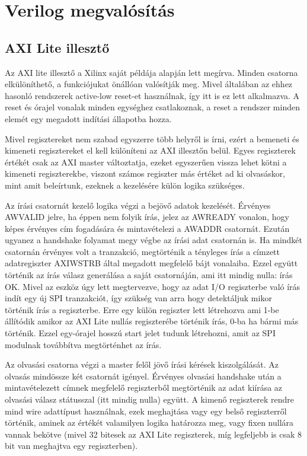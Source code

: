 \documentclass[a4paper,11pt]{article}
\begin{document}
\section{Verilog megvalósítás}

\subsection{AXI Lite illesztő}
Az AXI lite illesztő a Xilinx saját példája alapján lett megírva. Minden csatorna elkülöníthető, a funkciójukat önállóan valósítják meg. Mivel általában az ehhez hasonló rendszerek active-low reset-et használnak, így itt is ez lett alkalmazva. A reset és órajel vonalak minden egységhez csatlakoznak, a reset a rendszer minden elemét egy megadott indítási állapotba hozza.

Mivel regisztereket nem szabad egyszerre több helyről is írni, ezért a bemeneti és kimeneti regisztereket el kell különíteni az AXI illesztőn belül. Egyes regiszterek értékét csak az AXI master változtatja, ezeket egyszerűen vissza lehet kötni a kimeneti regiszterekbe, viszont számos regiszter más értéket ad ki olvasáskor, mint amit beleírtunk, ezeknek a kezelésére külön logika szükséges.

Az írási csatornát kezelő logika végzi a bejövő adatok kezelését. Érvényes AWVALID jelre, ha éppen nem folyik írás, jelez az AWREADY vonalon, hogy képes érvényes cím fogadására és mintavételezi a AWADDR csatornát. Ezután ugyanez a handshake folyamat megy végbe az írási adat csatornán is. Ha mindkét csatornán érvényes volt a tranzakció, megtörténik a tényleges írás a címzett adatregiszter AXI\textunderscore WSTRB által megadott megfelelő bájt vonalaiba. Ezzel együtt történik az írás válasz generálása a saját csatornáján, ami itt mindig nulla: írás OK. Mivel az eszköz úgy lett megtervezve, hogy az adat I/O regiszterbe való írás indít egy új SPI tranzakciót, így szükség van arra hogy detektáljuk mikor történik írás a regiszterbe. Erre egy külön regiszter lett létrehozva ami 1-be állítódik amikor az AXI Lite nullás regiszterébe történik írás, 0-ba ha bármi más történik. Ezzel egy-órajel hosszú start jelet tudunk létrehozni, amit az SPI modulnak továbbítva megtörténhet az írás.

Az olvasási csatorna végzi a master felől jövő írási kérések kiszolgálását. Az olvasás mindössze két csatornát igényel. Érvényes olvasási handshake után a mintavételezett címnek megfelelő regiszterből megtörténik az adat kiírása az olvasási válasz státusszal (itt mindig nulla) együtt. A kimenő regiszterek rendre mind wire adattípust használnak, ezek meghajtása vagy egy belső regiszterről történik, aminek az értékét valamilyen logika határozza meg, vagy fixen nullára vannak bekötve (mivel 32 bitesek az AXI Lite regiszterek, míg legfeljebb is csak 8 bit van meghajtva egy regiszterben).
\end{document}
